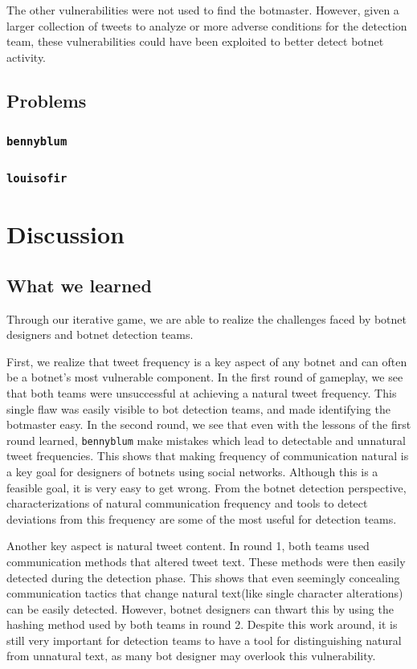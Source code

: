 \documentclass[11pt, oneside]{article} %
\numberwithin{equation}{section} %
\numberwithin{figure}{section} %
\numberwithin{table}{section} %
\renewcommand{\c}[1]{\texttt{#1}}
\newcommand{\teambb}{\c{bennyblum}}
\newcommand{\teamol}{\c{louisofir}}
\begin{document}
			The other vulnerabilities were not used to find the botmaster.  However, given a larger collection of tweets to analyze or more adverse conditions for the detection team, these vulnerabilities could have been exploited to better detect botnet activity.
	\subsection{Problems}
		\subsubsection{\teambb{}}

		\subsubsection{\teamol{}}

\section{Discussion}

	\subsection{What we learned}
		Through our iterative game, we are able to realize the challenges faced by botnet designers and botnet detection teams. 

		First, we realize that tweet frequency is a key aspect of any botnet and can often be a botnet's most vulnerable component. In the first round of gameplay, we see that both teams were unsuccessful at achieving a natural tweet frequency. This single flaw was easily visible to bot detection teams, and made identifying the botmaster easy. In the second round, we see that even with the lessons of the first round learned, \teambb{} make mistakes which lead to detectable and unnatural tweet frequencies. This shows that making frequency of communication natural is a key goal for designers of botnets using social networks. Although this is a feasible goal, it is very easy to get wrong. From the botnet detection perspective, characterizations of natural communication frequency and tools to detect deviations from this frequency are some of the most useful for detection teams. 

		Another key aspect is natural tweet content. In round 1, both teams used communication methods that altered tweet text. These methods were then easily detected during the detection phase. This shows that even seemingly concealing communication tactics that change natural text(like single character alterations) can be easily detected. However, botnet designers can thwart this by using the hashing method used by both teams in round 2. Despite this work around, it is still very important for detection teams to have a tool for distinguishing natural from unnatural text, as many bot designer may overlook this vulnerability.
\end{document}
